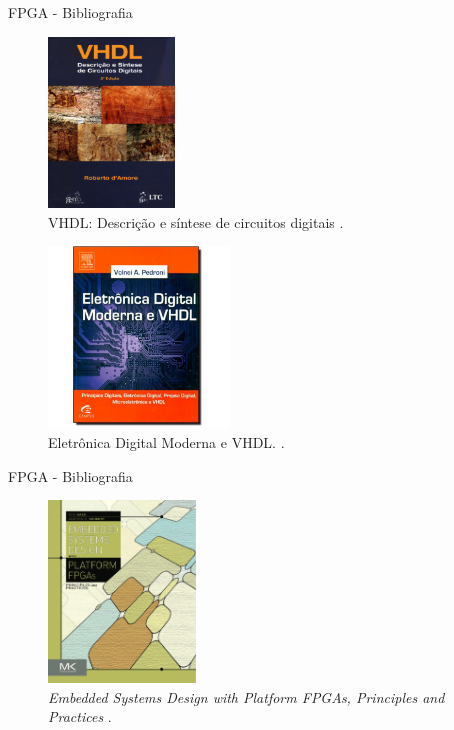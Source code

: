 	\begin{frame}{FPGA - Bibliografia}
		\begin{multicols}{2}
			\begin{figure}[p]
				\centering
				\includegraphics[width=0.3\textwidth]{img/fpga/l4.png}
				\caption{VHDL: Descrição e síntese de circuitos digitais \cite{DAmore2005}.}
				\label{fig:l4}
			\end{figure}
			\columnbreak
			\begin{figure}[p]
				\centering
				\includegraphics[width=0.43\textwidth]{img/fpga/l5.jpg}
				\caption{Eletrônica Digital Moderna e VHDL.  \cite{PEDRONI2010}.}
				\label{fig:l5}
			\end{figure}
		\end{multicols}
	\end{frame}


	\begin{frame}{FPGA - Bibliografia}
		\begin{figure}[p]
			\centering
			\includegraphics[width=0.35\textwidth]{img/fpga/l6.png}
			\caption{\textit{Embedded Systems Design with Platform FPGAs,
				Principles and Practices} \cite{Sass2010} .}
			\label{fig:l6}
		\end{figure}
	\end{frame}


